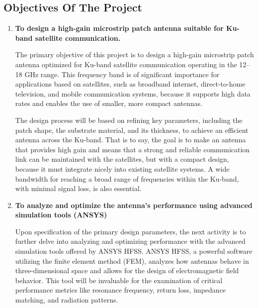 \documentclass[12pt]{article}
\begin{document}

\newpage
\subsection{Objectives Of The Project}

\begin{enumerate}
    \item \textbf{To design a high-gain microstrip patch antenna suitable for Ku-band satellite communication.}

    \par The primary objective of this project is to design a high-gain microstrip patch antenna optimized for Ku-band satellite communication operating in the 12–18 GHz range. This frequency band is of significant importance for applications based on satellites, such as broadband internet, direct-to-home television, and mobile communication systems, because it supports high data rates and enables the use of smaller, more compact antennas.\\

    \par The design process will be based on refining key parameters, including the patch shape, the substrate material, and its thickness, to achieve an efficient antenna across the Ku-band. That is to say, the goal is to make an antenna that provides high gain and means that a strong and reliable communication link can be maintained with the satellites, but with a compact design, because it must integrate nicely into existing satellite systems. A wide bandwidth for reaching a broad range of frequencies within the Ku-band, with minimal signal loss, is also essential.\\

    \item \textbf{To analyze and optimize the antenna’s performance using advanced simulation tools (ANSYS)}

    \par Upon specification of the primary design parameters, the next activity is to further delve into analyzing and optimizing performance with the advanced simulation tools offered by ANSYS HFSS. ANSYS HFSS, a powerful software utilizing the finite element method (FEM), analyzes how antennas behave in three-dimensional space and allows for the design of electromagnetic field behavior. This tool will be invaluable for the examination of critical performance metrics like resonance frequency, return loss, impedance matching, and radiation patterns.\\


\end{enumerate}
\end{document}
